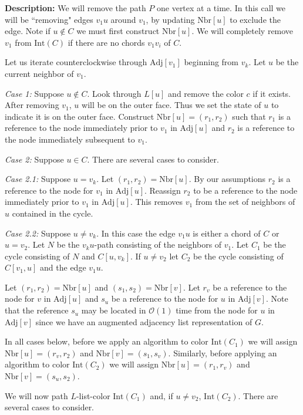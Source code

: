 \documentclass[letterpaper, 12pt]{article}
\theoremstyle{thm}
\begin{document}
\noindent\textbf{Description:} We will remove the path $P$ one vertex at a
time. In this call we will be ``removing" edges $v_1u$ around $v_1$, by updating
$\text{Nbr}[u]$ to exclude the edge. Note if $u\not\in C$ we must first
construct $\text{Nbr}[u]$. We will completely remove $v_1$ from
$\text{Int}(C)$ if there are no chords $v_1v_i$ of $C$.

Let us iterate counterclockwise through $\text{Adj}[v_1]$ beginning from $v_k$.
Let $u$ be the current neighbor of $v_1$.

\textit{Case 1:} Suppose $u\not\in C$. Look through $L[u]$ and remove the color
$c$ if it exists. After removing $v_1$, $u$ will be on the
outer face. Thus we set the state of $u$ to indicate it is
on the outer face. Construct $\text{Nbr}[u]=(r_1,r_2)$ such that
$r_1$ is a reference to the node immediately prior to $v_1$ in $\text{Adj}[u]$
and $r_2$ is a reference to the node immediately subsequent to $v_1$.

\textit{Case 2:} Suppose $u\in C$. There are several cases to consider.

\textit{Case 2.1:} Suppose $u=v_k$. Let $(r_1,r_2)=\text{Nbr}[u]$. By our
assumptions $r_2$ is a reference to the node for $v_1$ in $\text{Adj}[u]$.
Reassign $r_2$ to be a reference to the node immediately prior to $v_1$ in
$\text{Adj}[u]$. This removes $v_1$ from the set of neighbors of $u$ contained
in the cycle.

\textit{Case 2.2:} Suppose $u\ne v_k$. In this case the edge $v_1u$ is either a
chord of $C$ or $u=v_2$. Let $N$ be the $v_ku$-path consisting of the neighbors
of $v_1$. Let $C_1$ be the cycle consisting of $N$ and $C[u,v_k]$. If $u\ne v_2$
let $C_2$ be the cycle consisting of $C[v_1,u]$ and the edge $v_1u$.

Let $(r_1,r_2)=\text{Nbr}[u]$ and
$(s_1,s_2)=\text{Nbr}[v]$. Let $r_v$ be a reference to the node for
$v$ in $\text{Adj}[u]$ and $s_u$ be a reference to the node for $u$ in
$\text{Adj}[v]$. Note that the reference $s_u$ may be located in $\mathcal{O}(1)$
time from the node for $u$ in $\text{Adj}[v]$ since we have an augmented adjacency
list representation of $G$.

In all cases below, before we apply an algorithm to color
$\text{Int}(C_1)$ we will assign $\text{Nbr}[u]=(r_v,r_2)$ and $\text{Nbr}[v]=
(s_1,s_v)$. Similarly, before applying an algorithm to color $\text{Int}(C_2)$
we will assign $\text{Nbr}[u]=(r_1,r_v)$ and $\text{Nbr}[v]=(s_u,s_2)$.

We will now path $L$-list-color $\text{Int}(C_1)$ and, if $u\ne v_2$,
$\text{Int}(C_2)$. There are several cases to consider.
\end{document}
